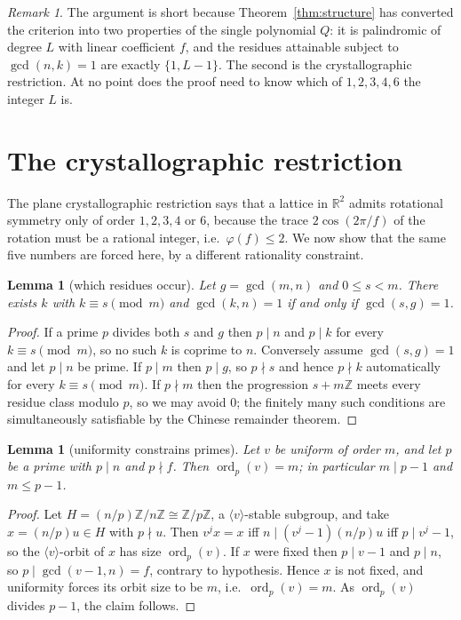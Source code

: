 \documentclass[11pt,a4paper]{article}
\theoremstyle{plain}
\newtheorem{lemma}[theorem]{Lemma}
\theoremstyle{definition}
\theoremstyle{remark}
\newtheorem{remark}[theorem]{Remark}
\newcommand{\Z}{\mathbb{Z}}
\newcommand{\R}{\mathbb{R}}
\newcommand{\Zn}{\Z/n\Z}
\newcommand{\ord}{\operatorname{ord}}
\begin{document}
\begin{remark}
The argument is short because Theorem~\ref{thm:structure} has converted the criterion into
two properties of the single polynomial $Q$: it is palindromic of degree $L$ with linear
coefficient $f$, and the residues attainable subject to $\gcd(n,k)=1$ are exactly
$\{1,L-1\}$. The second is the crystallographic restriction. At no point does the proof need
to know which of $1,2,3,4,6$ the integer $L$ is.
\end{remark}

\section{The crystallographic restriction}\label{sec:crystal}

The plane crystallographic restriction says that a lattice in $\R^2$ admits rotational
symmetry only of order $1,2,3,4$ or $6$, because the trace $2\cos(2\pi/f)$ of the rotation
must be a rational integer, i.e.\ $\varphi(f)\le2$. We now show that the same five numbers
are forced here, by a different rationality constraint.

\begin{lemma}[which residues occur]\label{lem:residues}
Let $g=\gcd(m,n)$ and $0\le s<m$. There exists $k$ with $k\equiv s\pmod m$ and
$\gcd(k,n)=1$ if and only if $\gcd(s,g)=1$.
\end{lemma}

\begin{proof}
If a prime $p$ divides both $s$ and $g$ then $p\mid n$ and $p\mid k$ for every $k\equiv
s\pmod m$, so no such $k$ is coprime to $n$. Conversely assume $\gcd(s,g)=1$ and let $p\mid
n$ be prime. If $p\mid m$ then $p\mid g$, so $p\nmid s$ and hence $p\nmid k$ automatically
for every $k\equiv s\pmod m$. If $p\nmid m$ then the progression $s+m\Z$ meets every residue
class modulo $p$, so we may avoid $0$; the finitely many such conditions are simultaneously
satisfiable by the Chinese remainder theorem.
\end{proof}

\begin{lemma}[uniformity constrains primes]\label{lem:uniformprime}
Let $v$ be uniform of order $m$, and let $p$ be a prime with $p\mid n$ and $p\nmid f$. Then
$\ord_p(v)=m$; in particular $m\mid p-1$ and $m\le p-1$.
\end{lemma}

\begin{proof}
Let $H=(n/p)\Zn\cong\Z/p\Z$, a $\langle v\rangle$-stable subgroup, and take $x=(n/p)u\in H$
with $p\nmid u$. Then $v^{j}x=x$ iff $n\mid (v^{j}-1)(n/p)u$ iff $p\mid v^{j}-1$, so the
$\langle v\rangle$-orbit of $x$ has size $\ord_p(v)$. If $x$ were fixed then $p\mid v-1$ and
$p\mid n$, so $p\mid\gcd(v-1,n)=f$, contrary to hypothesis. Hence $x$ is not fixed, and
uniformity forces its orbit size to be $m$, i.e.\ $\ord_p(v)=m$. As $\ord_p(v)$ divides
$p-1$, the claim follows.
\end{proof}
\end{document}
